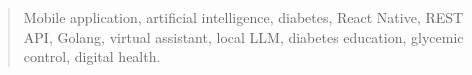 \documentclass[a4paper,12pt,twoside]{memoir}
\begin{document}
\renewcommand*\abstractname{Keywords}
\begin{abstract}
Mobile application, artificial intelligence, diabetes, React Native, REST API, Golang, virtual assistant, local LLM, diabetes education, glycemic control, digital health.
\end{abstract}

\clearpage

\tableofcontents

\clearpage

\listoffigures

\clearpage

\listoftables
\clearpage

\mainmatter











\end{document}
